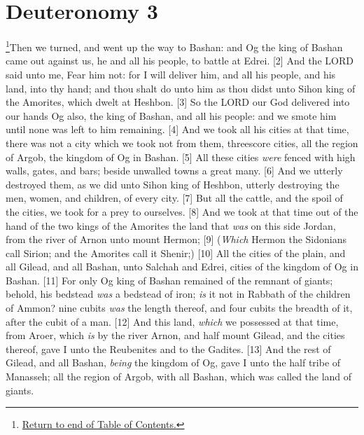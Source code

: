 \chapter{Deuteronomy 3}
\footnote{\textcolor[rgb]{0.00,0.25,0.00}{\hyperlink{DeuteronomyTOC}{Return to end of Table of Contents.}}}\textcolor[rgb]{0.00,0.00,1.00}{Then we turned, and went up the way to Bashan: and Og the king of Bashan came out against us, he and all his people, to battle at Edrei.}
[2] \textcolor[rgb]{0.00,0.00,1.00}{And the LORD said unto me, Fear him not: for I will deliver him, and all his people, and his land, into thy hand; and thou shalt do unto him as thou didst unto Sihon king of the Amorites, which dwelt at Heshbon.}
[3] \textcolor[rgb]{0.00,0.00,1.00}{So the LORD our God delivered into our hands Og also, the king of Bashan, and all his people: and we smote him until none was left to him remaining.}
[4] \textcolor[rgb]{0.00,0.00,1.00}{And we took all his cities at that time, there was not a city which we took not from them, threescore cities, all the region of Argob, the kingdom of Og in Bashan.}
[5] \textcolor[rgb]{0.00,0.00,1.00}{All these cities \emph{were} fenced with high walls, gates, and bars; beside unwalled towns a great many.}
[6] \textcolor[rgb]{0.00,0.00,1.00}{And we utterly destroyed them, as we did unto Sihon king of Heshbon, utterly destroying the men, women, and children, of every city.}
[7] \textcolor[rgb]{0.00,0.00,1.00}{But all the cattle, and the spoil of the cities, we took for a prey to ourselves.}
[8] \textcolor[rgb]{0.00,0.00,1.00}{And we took at that time out of the hand of the two kings of the Amorites the land that \emph{was} on this side Jordan, from the river of Arnon unto mount Hermon;}
[9] \textcolor[rgb]{0.00,0.00,1.00}{(\emph{Which} Hermon the Sidonians call Sirion; and the Amorites call it Shenir;)}
[10] \textcolor[rgb]{0.00,0.00,1.00}{All the cities of the plain, and all Gilead, and all Bashan, unto Salchah and Edrei, cities of the kingdom of Og in Bashan.}
[11] \textcolor[rgb]{0.00,0.00,1.00}{For only Og king of Bashan remained of the remnant of giants; behold, his bedstead \emph{was} a bedstead of iron; \emph{is} it not in Rabbath of the children of Ammon? nine cubits \emph{was} the length thereof, and four cubits the breadth of it, after the cubit of a man.}
[12] \textcolor[rgb]{0.00,0.00,1.00}{And this land, \emph{which} we possessed at that time, from Aroer, which \emph{is} by the river Arnon, and half mount Gilead, and the cities thereof, gave I unto the Reubenites and to the Gadites.}
[13] \textcolor[rgb]{0.00,0.00,1.00}{And the rest of Gilead, and all Bashan, \emph{being} the kingdom of Og, gave I unto the half tribe of Manasseh; all the region of Argob, with all Bashan, which was called the land of giants.}
